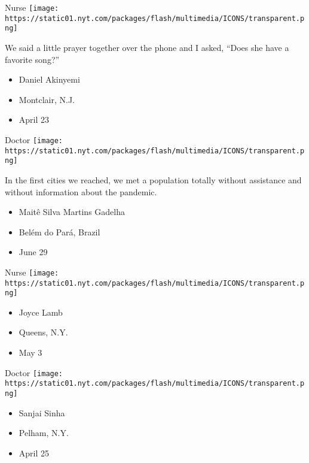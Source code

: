 \protect\hyperlink{item-daniel-akinyemi}{}

Nurse
\texttt{[image: https://static01.nyt.com/packages/flash/multimedia/ICONS/transparent.png]}

We said a little prayer together over the phone and I asked, ``Does she
have a favorite song?''

\begin{itemize}
\tightlist
\item
  Daniel Akinyemi
\item
  Montclair, N.J.
\item
  April 23
\end{itemize}

\protect\hyperlink{item-maite-silva-martins-gadelha}{}

Doctor
\texttt{[image: https://static01.nyt.com/packages/flash/multimedia/ICONS/transparent.png]}

In the first cities we reached, we met a population totally without
assistance and without information about the pandemic.

\begin{itemize}
\tightlist
\item
  Maitê Silva Martins Gadelha
\item
  Belém do Pará, Brazil
\item
  June 29
\end{itemize}

\protect\hyperlink{item-joyce-lamb}{}

Nurse
\texttt{[image: https://static01.nyt.com/packages/flash/multimedia/ICONS/transparent.png]}

\begin{itemize}
\tightlist
\item
  Joyce Lamb
\item
  Queens, N.Y.
\item
  May 3
\end{itemize}

\protect\hyperlink{item-sanjai-sinha}{}

Doctor
\texttt{[image: https://static01.nyt.com/packages/flash/multimedia/ICONS/transparent.png]}

\begin{itemize}
\tightlist
\item
  Sanjai Sinha
\item
  Pelham, N.Y.
\item
  April 25
\end{itemize}

\protect\hyperlink{item-kenji-fujiwara}{}

